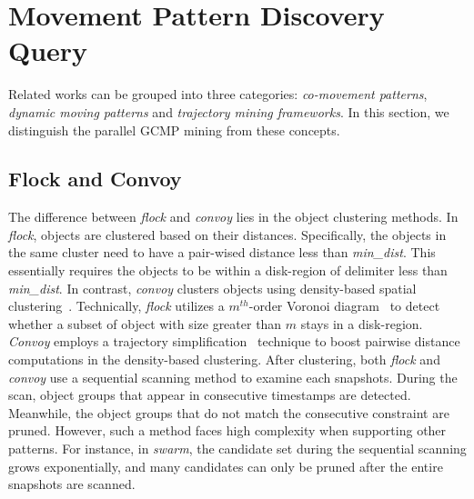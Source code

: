 \section{Movement Pattern Discovery Query}
\label{sec:related_works}
Related works can be grouped into three categories: \emph{co-movement patterns},
\emph{dynamic moving patterns} and \emph{trajectory mining frameworks}.
In this section, we distinguish the parallel GCMP mining from these concepts.


\subsection{Flock and Convoy}
The difference between \emph{flock} and \emph{convoy} lies 
in the object clustering methods. In \emph{flock},
objects are clustered based on their distances. Specifically, the
objects in the same cluster need to have a pair-wised distance less than \emph{min\_dist}. 
This essentially requires the objects to be within a disk-region of delimiter less than \emph{min\_dist}.
In contrast, \emph{convoy} clusters objects using density-based spatial clustering~\cite{ester1996density}.
Technically, \emph{flock} utilizes a $m^{th}$-order Voronoi diagram~\cite{laube2005finding} to detect whether
a subset of object with size greater than $m$ stays in a disk-region. \emph{Convoy} employs
a trajectory simplification~\cite{douglas1973linesimplification} technique to boost pairwise distance computations in
the density-based clustering.
After clustering, both \emph{flock} and \emph{convoy} use a sequential scanning
method to examine each snapshots. During the scan, object
groups that appear in consecutive timestamps are detected. Meanwhile, the object groups that do not
match the consecutive constraint are pruned. 
However, such a method faces high complexity when supporting other patterns.
For instance, in \emph{swarm}, the candidate set during the sequential scanning grows
exponentially, and many candidates can only be pruned after the entire snapshots are scanned.

